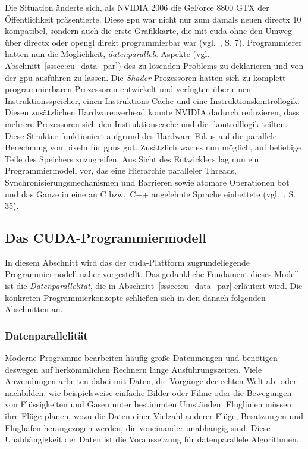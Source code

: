 Die Situation änderte sich, als NVIDIA 2006 die GeForce 8800 GTX der Öffentlichkeit präsentierte. Diese \gls{gpu} war
nicht nur zum damals neuen \gls{directx} 10 kompatibel, sondern auch die erste Grafikkarte, die mit \gls{cuda} ohne den
Umweg über \gls{directx} oder \gls{opengl} direkt programmierbar war (vgl.~\cite{sandkand}, S. 7). Programmierer hatten
nun die Möglichkeit, \textit{datenparallele} Aspekte (vgl. Abschnitt~\ref{sssec:cu_data_par}) des zu lösenden Problems
zu deklarieren und von der \gls{gpu} ausführen zu lassen. Die \textit{Shader}-Prozessoren hatten sich zu komplett
programmierbaren Prozessoren entwickelt und verfügten über einen Instruktionsspeicher, einen Instruktions-Cache und eine
Instruktionskontrollogik. Diesen zusätzlichen Hardwareoverhead konnte NVIDIA dadurch reduzieren, dass mehrere
Prozessoren sich den Instruktionscache und die -kontrolllogik teilten. Diese Struktur funktioniert aufgrund des
Hardware-Fokus auf die parallele Berechnung von \gls{pixel}n für \gls{gpu}s gut. Zusätzlich war es nun möglich, auf
beliebige Teile des Speichers zuzugreifen. Aus Sicht des Entwicklers lag nun ein Programmiermodell vor, das eine
Hierarchie paralleler Threads, Synchronisierungsmechanismen und Barrieren sowie atomare Operationen bot und das Ganze in
eine an C bzw.\ C++ angelehnte Sprache einbettete (vgl.~\cite{kirkhwu}, S. 35).

\subsection{Das CUDA-Programmiermodell}\label{cuda:modell}

In diesem Abschnitt wird das der \gls{cuda}-Plattform zugrundeliegende Programmiermodell näher vorgestellt. Das
gedankliche Fundament dieses Modell ist die \textit{Datenparallelität}, die in Abschnitt~\ref{sssec:cu_data_par}
erläutert wird. Die konkreten Programmierkonzepte schließen sich in den danach folgenden Abschnitten an.

\subsubsection*{Datenparallelität}\label{ssec:cu_data_par}

Moderne Programme bearbeiten häufig große Datenmengen und benötigen deswegen auf herkömmlichen Rechnern lange
Ausführungszeiten. Viele Anwendungen arbeiten dabei mit Daten, die Vorgänge der echten Welt ab- oder nachbilden, wie
beispielsweise einfache Bilder oder Filme oder die Bewegungen von Flüssigkeiten und Gasen unter bestimmten Umständen.
Fluglinien müssen ihre Flüge planen, wozu die Daten einer Vielzahl anderer Flüge, Besatzungen und Flughäfen herangezogen
werden, die voneinander unabhängig sind. Diese Unabhängigkeit der Daten ist die Voraussetzung für datenparallele
Algorithmen.

